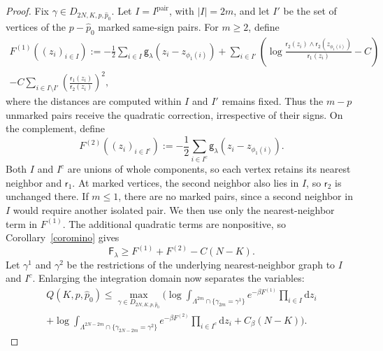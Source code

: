 \documentclass[a4paper,10pt,leqno]{amsart}
\numberwithin{equation}{section}
\newcommand{\dd}{\mathrm{d}}
\def\g{\mathsf{g}}
\def\F{\mathsf{F}}
\def\rr{\mathsf{r}}
\def\pair{\mathrm{pair}}
\begin{document}
\begin{proof}
  Fix $\gamma\in D_{2N,K,p,\widehat p_0}$. Let $I=I^{\pair}$, with $|I|=2m$, and let $I'$ be the set of vertices of the $p-\widehat p_0$ marked same-sign pairs. For $m\ge2$, define
  \begin{multline*}
    F^{(1)}((z_i)_{i\in I}):=-\frac12\sum_{i\in I}\g_\lambda(z_i-z_{\phi_1(i)})
    +\sum_{i\in I'}\left(\log\frac{\rr_2(z_i)\wedge\rr_2(z_{\phi_1(i)})}{\rr_1(z_i)}-C\right)\\
    -C\sum_{i\in I\setminus I'}\left(\frac{\rr_1(z_i)}{\rr_2(z_i)}\right)^2,
  \end{multline*}
  where the distances are computed within $I$ and $I'$ remains fixed. Thus the $m-p$ unmarked pairs receive the quadratic correction, irrespective of their signs. On the complement, define
  \begin{equation*}
    F^{(2)}((z_i)_{i\in I^c}):=-\frac12\sum_{i\in I^c}\g_\lambda(z_i-z_{\phi_1(i)}).
  \end{equation*}
  Both $I$ and $I^c$ are unions of whole components, so each vertex retains its nearest neighbor and $\rr_1$. At marked vertices, the second neighbor also lies in $I$, so $\rr_2$ is unchanged there. If $m\le1$, there are no marked pairs, since a second neighbor in $I$ would require another isolated pair. We then use only the nearest-neighbor term in $F^{(1)}$. The additional quadratic terms are nonpositive, so Corollary~\ref{coromino} gives
  \[
    \F_\lambda\ge F^{(1)}+F^{(2)}-C(N-K).
  \]
  Let $\gamma^1$ and $\gamma^2$ be the restrictions of the underlying nearest-neighbor graph to $I$ and $I^c$. Enlarging the integration domain now separates the variables:
  \begin{multline}\label{gred3}
    Q(K,p,\widehat p_0)\le\max_{\gamma\in D_{2N,K,p,\widehat p_0}}\Bigg(
    \log\int_{\Lambda^{2m}\cap\{\gamma_{2m}=\gamma^1\}}e^{-\beta F^{(1)}}\prod_{i\in I}\dd z_i\\
    +\log\int_{\Lambda^{2N-2m}\cap\{\gamma_{2N-2m}=\gamma^2\}}e^{-\beta F^{(2)}}\prod_{i\in I^c}\dd z_i+C_\beta(N-K)\Bigg).
  \end{multline}


\end{proof}
\end{document}
